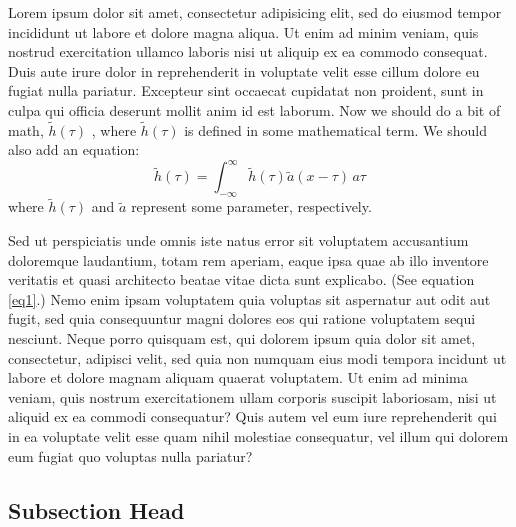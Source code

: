 Lorem ipsum dolor sit amet, consectetur adipisicing elit, sed do eiusmod tempor incididunt ut labore et dolore magna aliqua. Ut enim ad minim veniam, quis nostrud exercitation ullamco laboris nisi ut aliquip ex ea commodo consequat. Duis aute irure dolor in reprehenderit in voluptate velit esse cillum dolore eu fugiat nulla pariatur. Excepteur sint occaecat cupidatat non proident, sunt in culpa qui officia deserunt mollit anim id est laborum. Now we should do a bit of math, $\widetilde{h}(\tau)$ , where $\widetilde{h}(\tau)$
is defined in some mathematical term. We should also add an equation:
\begin{equation}
\widetilde{h}(\tau)=\int_{-\infty}^{\infty}\widetilde{h}(\tau)\widetilde
{a}(x-\tau)\,a\tau\label{eq1}%
\end{equation}
where $\widetilde{h}(\tau)$ and $\widetilde{a}$ represent some parameter, respectively.

Sed ut perspiciatis unde omnis iste natus error sit voluptatem accusantium doloremque laudantium, totam rem aperiam, eaque ipsa quae ab illo inventore veritatis et quasi architecto beatae vitae dicta sunt explicabo. (See equation \ref{eq1}.) Nemo enim ipsam voluptatem quia voluptas sit aspernatur aut odit aut fugit, sed quia consequuntur magni dolores eos qui ratione voluptatem sequi nesciunt. Neque porro quisquam est, qui dolorem ipsum quia dolor sit amet, consectetur, adipisci velit, sed quia non numquam eius modi tempora incidunt ut labore et dolore magnam aliquam quaerat voluptatem. Ut enim ad minima veniam, quis nostrum exercitationem ullam corporis suscipit laboriosam, nisi ut aliquid ex ea commodi consequatur? Quis autem vel eum iure reprehenderit qui in ea voluptate velit esse quam nihil molestiae consequatur, vel illum qui dolorem eum fugiat quo voluptas nulla pariatur?



\subsection{Subsection Head}

